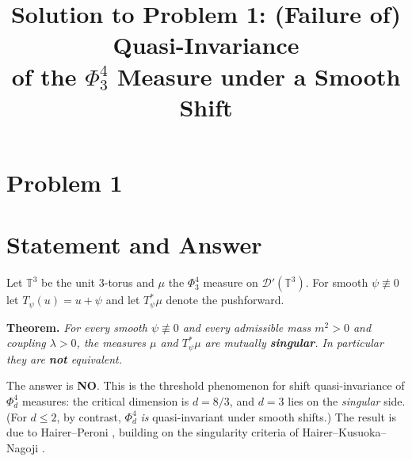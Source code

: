 \clearpage
\section*{Problem 1}
\begingroup
\hypersetup{colorlinks=true,
            linkcolor=blue!50!black,
            citecolor=blue!50!black,
            urlcolor=blue!50!black}
\newcommand{\qoneT}{\mathbb{T}}
\newcommand{\qoneR}{\mathbb{R}}
\newcommand{\qoneN}{\mathbb{N}}
\newcommand{\qoneC}{\mathcal{C}}
\newcommand{\qoneD}{\mathcal{D}}
\newcommand{\qoneE}{\mathbb{E}}
\newcommand{\qoneHp}{H}      %
\newcommand{\qonePN}{P_N}
\newcommand{\qoneLin}{\mathbf{l}}   %
\newcommand{\qoneLsq}{\mathbf{q}}   %
\newcommand{\qoneLcb}{\mathbf{c}}   %
\newcommand{\qoneIqc}{\mathbf{C}}   %
\newtheorem{qonetheorem}{Theorem}
\newtheorem{qonelemma}{Lemma}
\newtheorem{qoneproposition}{Proposition}
\newtheorem{qonecorollary}{Corollary}
\newtheorem{remark}{Remark}
\title{Solution to Problem 1: (Failure of) Quasi-Invariance\\
of the $\Phi^4_3$ Measure under a Smooth Shift}
\author{}
\date{}
\maketitle

\section*{Statement and Answer}

Let $\qoneT^3$ be the unit $3$-torus and $\mu$ the $\Phi^4_3$ measure on
$\qoneD'(\qoneT^3)$. For smooth $\psi\not\equiv0$ let $T_\psi(u)=u+\psi$ and let
$T_\psi^*\mu$ denote the pushforward.

\medskip
\noindent\textbf{Theorem.} \emph{For every smooth $\psi\not\equiv0$ and every
admissible mass $m^2>0$ and coupling $\lambda>0$, the measures $\mu$ and $T_\psi^*\mu$
are mutually \textbf{singular}. In particular they are \textbf{not} equivalent.}

\medskip
\noindent The answer is \textbf{NO}. This is the threshold phenomenon for shift
quasi-invariance of $\Phi^4_d$ measures: the critical dimension is $d=8/3$, and $d=3$
lies on the \emph{singular} side. (For $d\le 2$, by contrast, $\Phi^4_d$ \emph{is}
quasi-invariant under smooth shifts.) The result is due to Hairer--Peroni
\cite{HP25}, building on the singularity criteria of Hairer--Kusuoka--Nagoji
\cite{HKN24}.

